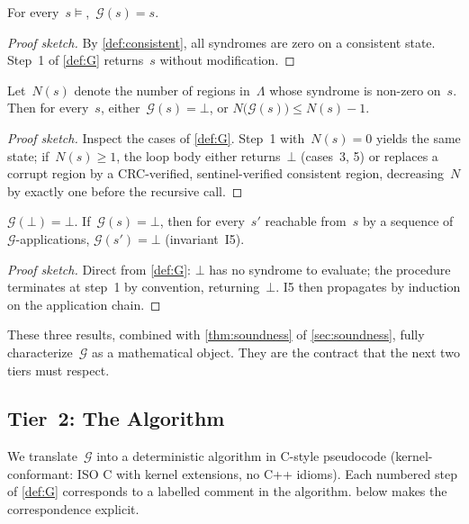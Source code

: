 \begin{proposition}\label{prop:idem}
For every~\(s \models\),~\(\mathcal{G}(s) = s\).
\end{proposition}
\begin{proof}[Proof sketch]
By \cref{def:consistent}, all syndromes are zero on a consistent
state. Step~1 of \cref{def:G} returns~\(s\) without modification.
\end{proof}

\begin{lemma}\label{lem:descent}
Let~\(N(s)\) denote the number of regions in~\(\Lambda\) whose
syndrome is non-zero on~\(s\). Then for every~\(s\),
either~\(\mathcal{G}(s) = \bot\), or
\(N\bigl(\mathcal{G}(s)\bigr) \le N(s) - 1.\)
\end{lemma}
\begin{proof}[Proof sketch]
Inspect the cases of \cref{def:G}. Step~1 with~\(N(s) = 0\) yields
the same state; if~\(N(s) \ge 1\), the loop body either
returns~\(\bot\) (cases~3, 5) or replaces a corrupt region by a
CRC-verified, sentinel-verified consistent region, decreasing~\(N\)
by exactly one before the recursive call.
\end{proof}

\begin{proposition}\label{prop:absorb}
\(\mathcal{G}(\bot) = \bot\). If~\(\mathcal{G}(s) = \bot\), then for
every~\(s'\) reachable from~\(s\) by a sequence of
\(\mathcal{G}\)-applications, \(\mathcal{G}(s') = \bot\) (invariant~I5).
\end{proposition}
\begin{proof}[Proof sketch]
Direct from \cref{def:G}: \(\bot\) has no syndrome to evaluate; the
procedure terminates at step~1 by convention, returning~\(\bot\).
I5 then propagates by induction on the application chain.
\end{proof}

These three results, combined with \cref{thm:soundness} of
\cref{sec:soundness}, fully characterize~\(\mathcal{G}\) as a
mathematical object. They are the contract that the next two tiers
must respect.

\subsection{Tier~2: The Algorithm}\label{sec:m2c-tier2}

We translate~\(\mathcal{G}\) into a deterministic algorithm in
C-style pseudocode (kernel-conformant: ISO C with kernel
extensions, no C++ idioms). Each numbered step of \cref{def:G}
corresponds to a labelled comment in the algorithm.
 below makes the correspondence explicit.


